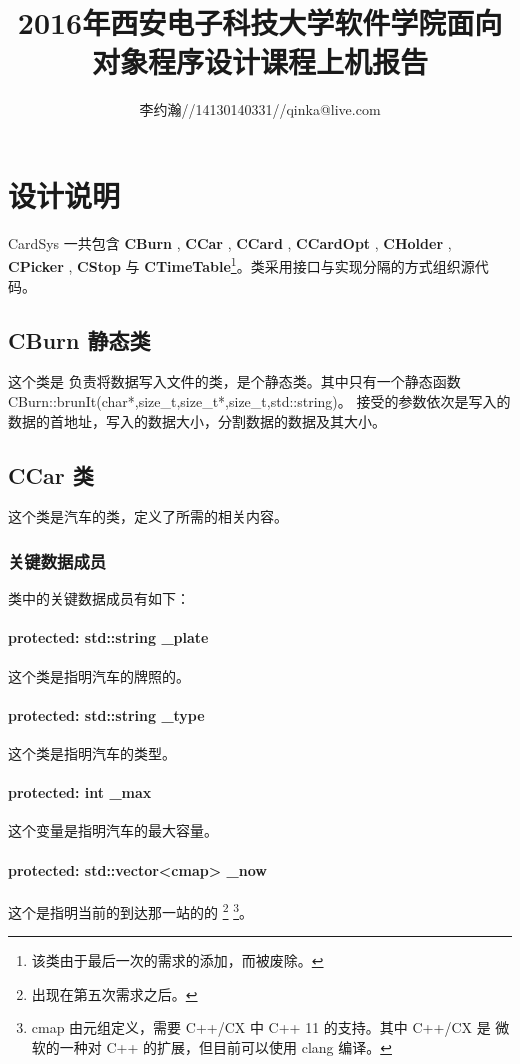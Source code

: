 \documentclass{ctexart}
\author{李约瀚//14130140331//qinka@live.com}
\title{2016年西安电子科技大学软件学院面向对象程序设计课程上机报告}
\begin{document}
    \maketitle
    \newpage
    \tableofcontents
    \newpage
    
    \section{设计说明}
    CardSys 一共包含 \textbf{CBurn} , \textbf{CCar} , \textbf{CCard} , \textbf{CCardOpt} ,   \textbf{CHolder} , \textbf{CPicker} , \textbf{CStop} 与 \textbf{CTimeTable}\footnote{该类由于最后一次的需求的添加，而被废除。}。类采用接口与实现分隔的方式组织源代码。
    \subsection{CBurn 静态类}
    这个类是 负责将数据写入文件的类，是个静态类。其中只有一个静态函数
     CBurn::brunIt(char*,size\_t,size\_t*,size\_t,std::string)。
    接受的参数依次是写入的数据的首地址，写入的数据大小，分割数据的数据及其大小。
    \subsection{CCar 类}
    这个类是汽车的类，定义了所需的相关内容。
    \subsubsection{关键数据成员}
    类中的关键数据成员有如下：
    \paragraph{protected: std::string \_plate} 这个类是指明汽车的牌照的。
    \paragraph{protected: std::string \_type} 这个类是指明汽车的类型。
    \paragraph{protected: int \_max} 这个变量是指明汽车的最大容量。
    \paragraph{protected: std::vector<cmap> \_now} 这个是指明当前的到达那一站的的
    \footnote{出现在第五次需求之后。}
    \footnote{cmap 由元组定义，需要 C++/CX 中 C++ 11 的支持。其中 C++/CX 是 微软的一种对 C++ 的扩展，但目前可以使用 clang 编译。}。
\end{document}

